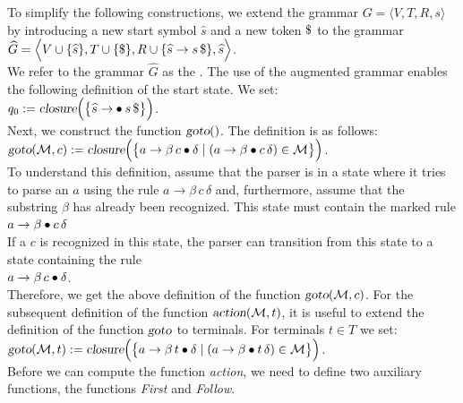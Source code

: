 To simplify the following constructions, we extend the
grammar \(G = \langle V, T, R, s \rangle\) by introducing a new start symbol \(\widehat{s}\)
and a new token \(\symbol{36}\) to the grammar
\\[0.2cm]
\hspace*{1.3cm}
\(\widehat{G} = 
 \Bigl\langle V \cup \{ \widehat{s} \}, T \cup \{\symbol{36}\}, R \cup \{ \widehat{s} \rightarrow s\, \symbol{36} \}, \widehat{s} \Bigr\rangle
\).
\\[0.2cm]
We refer to the grammar \(\widehat{G}\) as the .
The use of the augmented grammar enables the following definition of the start state.
We set:
\\[0.2cm]
\hspace*{1.3cm}
\( q_0 := \textsl{closure}\Bigl( \bigl\{ \widehat{s} \rightarrow \mdot s\,\symbol{36} \bigr\} \Bigr)\).
\\[0.2cm]
Next, we construct the function \(\textsl{goto}()\). The definition is as follows:
\\[0.2cm]
\hspace*{1.3cm}
\(\textsl{goto}(\mathcal{M}, c) := \textsl{closure}\Bigl( \bigl\{ 
   a \rightarrow \beta\, c \mdot \delta \mid (a \rightarrow \beta \mdot c\, \delta) \in \mathcal{M} 
   \bigr\} \Bigr)
\).
\\[0.2cm]
To understand this definition, assume that the parser is in a state where it
tries to parse an \(a\) using the rule \(a \rightarrow \beta\, c\, \delta\) and, furthermore, assume that the substring \(\beta\)
has already been recognized. This state must contain the marked rule 
\\[0.2cm]
\hspace*{1.3cm}
\(a \rightarrow \beta \mdot c\, \delta\)
\\[0.2cm]
If a \(c\) is recognized in this state, the parser can transition from this state to a state containing the
rule 
\\[0.2cm]
\hspace*{1.3cm}
\(a \rightarrow \beta\, c \mdot \delta\).
\\[0.2cm]
Therefore, we get the above definition of the function \(\textsl{goto}(\mathcal{M},c)\).
For the subsequent definition of the function \(\textsl{action}(\mathcal{M}, t)\), it is
useful to extend the definition of the function \(\textsl{goto}\) to terminals.
For terminals \(t \in T\) we set:
\\[0.2cm]
\hspace*{1.3cm}
\(\textsl{goto}(\mathcal{M}, t) := \textsl{closure}\Bigl( \bigl\{ 
   a \rightarrow \beta\, t \mdot \delta \mid (a \rightarrow \beta \mdot t\, \delta) \in \mathcal{M} 
   \bigr\} \Bigr)
\).
\\[0.2cm]
Before we can compute the function \textsl{action}, we need to define two auxiliary functions, 
the functions \textsl{First} and \textsl{Follow}.

